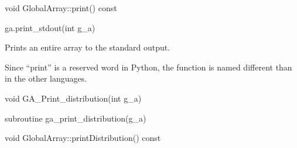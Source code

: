\documentclass[12pt]{article}
\begin{document}
\begin{cxxapi}
\begin{cxxcode}
void GlobalArray::print() const
\end{cxxcode}
\end{cxxapi}

\begin{pyapi}
\begin{pycode}
ga.print_stdout(int g_a)
\end{pycode}
\begin{funcargs}
\end{funcargs}
\end{pyapi}

\gcoll

\begin{desc}

Prints an entire array to the standard output.

\end{desc}

\begin{pydesc}

Since ``print'' is a reserved word in Python, the function is named different
than in the other languages.

\end{pydesc}


\begin{capi}
\begin{ccode}
void GA_Print_distribution(int g_a)
\end{ccode}
\begin{funcargs}
\end{funcargs}
\end{capi}

\begin{fapi}
\begin{fcode}
subroutine ga_print_distribution(g_a)
\end{fcode}
\begin{funcargs}
\end{funcargs}
\end{fapi}

\begin{cxxapi}
\begin{cxxcode}
void GlobalArray::printDistribution() const
\end{cxxcode}
\end{cxxapi}
\end{document}
